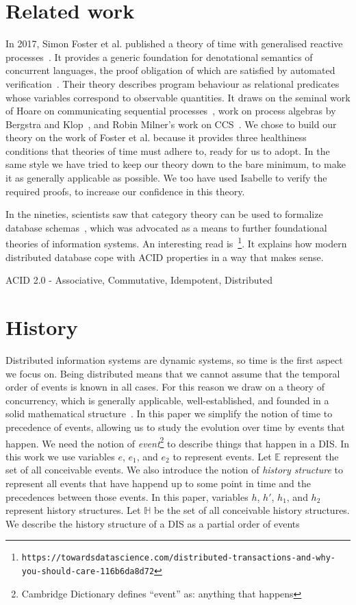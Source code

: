 \documentclass{elsarticle}
\begin{document}
\section{Related work}
\label{sct:Related work}
	In 2017, Simon Foster et al. published a theory of time with generalised reactive processes~\cite{DBLP:journals/ipl/FosterCWZ18}.
	It provides a generic foundation for denotational semantics of concurrent languages,
	the proof obligation of which are satisfied by automated verification~\cite{Foster14}.
	Their theory describes program behaviour as relational predicates whose variables correspond to observable quantities.
	It draws on the seminal work of Hoare on communicating sequential processes~\cite{HoareHe98},
	work on process algebras by Bergstra and Klop~\cite{DBLP:journals/iandc/BergstraK84}, and
	Robin Milner's work on CCS~\cite{Milner1989}.
	We chose to build our theory on the work of Foster et al. because it provides three healthiness conditions
	that theories of time must adhere to,
	ready for us to adopt.
	In the same style we have tried to keep our theory down to the bare minimum, to make it as generally applicable as possible.
	We too have used Isabelle to verify the required proofs,
	to increase our confidence in this theory.
	
\cite{Foster17c}
	In the nineties, scientists saw that category theory can be used to formalize database schemas~\cite{Frederiks1997},
	which was advocated as a means to further foundational theories of information systems.
	An interesting read is~\cite{Foster17c}\footnote{\tt\tiny https://towardsdatascience.com/distributed-transactions-and-why-you-should-care-116b6da8d72}.
	It explains how modern distributed database cope with ACID properties in a way that makes sense.

	ACID 2.0 - Associative, Commutative, Idempotent, Distributed

\section{History}
\label{sct:History}
	Distributed information systems are dynamic systems,
	so time is the first aspect we focus on.
	Being distributed means that we cannot assume that the temporal order of events is known in all cases.
	For this reason we draw on a theory of concurrency, which is generally applicable,
	well-established, and founded in a solid mathematical structure~\cite{Foster14}.
	In this paper we simplify the notion of time to precedence of events,
	allowing us to study the evolution over time by events that happen.
	We need the notion of {\em event}\footnote{Cambridge Dictionary defines ``event'' as: anything that happens} to describe things that happen in a DIS.
	In this work we use variables $e$, $e_1$, and $e_2$ to represent events.
	Let $\mathbb E$ represent the set of all conceivable events.
	We also introduce the notion of {\em history structure}
	to represent all events that have happend up to some point in time and the precedences between those events.
	In this paper, variables $h$, $h'$, $h_1$, and $h_2$ represent history structures.
	Let $\mathbb H$ be the set of all conceivable history structures.
	We describe the history structure of a DIS as a partial order of events
\end{document}
